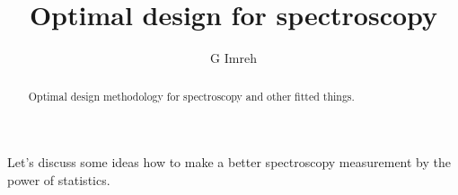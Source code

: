 \documentclass[12pt]{iopart}
\begin{document}
\title[Optimal design for spectroscopy]{Optimal design for spectroscopy}
\author{G Imreh}
\address{Institute of Atomic and Molecular Sciences, Academia Sinica, Taiwan}
\begin{abstract}
Optimal design methodology for spectroscopy and other fitted things.
\end{abstract}
\pacs{}
\submitto{\MST}

Let's discuss some ideas how to make a better spectroscopy measurement by the power of statistics.
\end{document}
